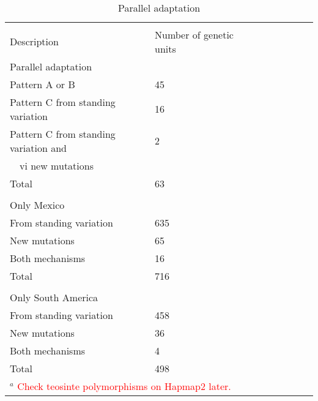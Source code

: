 \renewcommand{\arraystretch}{1.1}
\begin{table}[tb]

\begin{center}
 \caption[]{Parallel adaptation\hspace*{0.3cm}}
  \textbf{}\\[-2mm]
{\fontsize{7}{11}\sf
    \begin{tabular}{lllcccccl} \hline
       & & \\[-3mm]
     Description  & Number of genetic units\\[0.1cm]
    \hline
Parallel adaptation     &  \\
Pattern A or B     & 45 \\
Pattern C from standing variation & 16\\ 
Pattern C from standing variation and & 2\\
\ \ vi new mutations & \\
Total & 63\\
      \hline
    & & \\[-3mm]
Only Mexico     &  \\
From standing variation & 635 \\
New mutations & 65 \\
Both mechanisms & 16 \\
Total & 716\\
      \hline
    & & \\[-3mm]
Only South America     &  \\
From standing variation & 458 \\
New mutations & 36 \\
Both mechanisms & 4 \\
Total & 498\\[1mm]
    \hline
  \multicolumn{2}{l}{$^{a}$ \textcolor{red}{Check teosinte polymorphisms on Hapmap2 later.}}\\
    \end{tabular}
    \label{paraGU}  %
}
\end{center}
\end{table}
\renewcommand{\arraystretch}{1}


